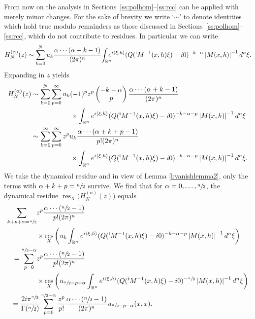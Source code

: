 \documentclass[10pt]{amsart}
\theoremstyle{definition}
\let\cv\alpha
\let\euler X
\DeclareMathOperator{\resnorm}{res}
\newcommand{\resdyn}{{\resnorm_\euler}}
\newcommand{\module}[1]{\left|#1\right|}
\newcommand{\secs}[2]{Sections~\ref{#1}--\ref{#2}}
\def\sn2{\sfrac{n}{2}}
\renewcommand{\t}{{{}^{\mathrm{t}\mkern-2mu}}}
\begin{document}
From now on the analysis in \secs{ss:polhom}{ss:rcc} can be applied with merely minor changes. For the sake of brevity we write `$\sim$' to denote identities which hold true modulo remainders as those discussed in \secs{ss:polhom}{ss:rcc}, which do not contribute to residues. In particular we can write
\[
H_N^{(\cv)}(z) \sim \sum_{k=0}^N u_k \frac{\cv\cdots(\cv+k-1)}{(2\pi)^n} \!\int_{\mathbb{R}^n}\hspace*{-2.5mm} e^{i\left\langle\xi,h \right\rangle}
(Q(\t M^{-1}(x,h)\xi)-i0)^{-k-\cv} \module{M(x,h)}^{-1} d^n\xi.
\]
Expanding in $z$ yields
\[
\begin{aligned}
H_N^{(\cv)}(z)&\sim \sum_{k=0}^N\sum_{p=0}^\infty u_k (-1)^pz^p \begin{pmatrix}
-k-\cv
\\
p
\end{pmatrix} \frac{\cv\cdots(\cv+k-1)}{(2\pi)^n}\\
&\hspace*{2cm} \times \int_{\mathbb{R}^n} e^{i\left\langle\xi,h \right\rangle}
(Q(\t M^{-1}(x,h)\xi)-i0)^{-k-\cv-p} \module{M(x,h)}^{-1} d^n\xi
\\ & \sim \sum_{k=0}^\infty \sum_{p=0}^\infty z^p u_k \frac{\cv\cdots(\cv+k+p-1)}{p!(2\pi)^n}\\
&\hspace*{2cm} \times\int_{\mathbb{R}^n} e^{i\left\langle\xi,h \right\rangle}
(Q(\t M^{-1}(x,h)\xi)-i0)^{-k-\cv-p} \module{M(x,h)}^{-1} d^n\xi.
\end{aligned}
\]
We take the dynamical residue and in view of Lemma \ref{l:vanishlemma2}, only the
terms with $\cv+k+p=\sfrac{n}{2}$ survive. We find that for $\cv=0,\dots,\sn2$, the dynamical residue $\resdyn\big(H_N^{(\cv)}(z)\big)$ equals
\[
\begin{aligned}
\sum_{k+p+\cv=\sfrac{n}{2}}
&z^p \frac{\cv\cdots(\sfrac{n}{2}-1)}{p!(2\pi)^n}\\
&\times\resdyn\left(u_k\int_{\mathbb{R}^n} e^{i\left\langle\xi,h \right\rangle}
(Q(\t M^{-1}(x,h)\xi)-i0)^{-k-\cv-p} \module{M(x,h)}^{-1} d^n\xi\right)
\\
=\sum_{p=0}^{\sfrac{n}{2}-\cv}
&z^p \frac{\cv\cdots(\sfrac{n}{2}-1)}{p!(2\pi)^n}\\
&\times\resdyn\left(u_{\sfrac{n}{2}-p-\cv}\int_{\mathbb{R}^n} e^{i\left\langle\xi,h \right\rangle}
(Q(\t M^{-1}(x,h)\xi)-i0)^{-\sfrac{n}{2}} \module{M(x,h)}^{-1} d^n\xi\right)\\
&\hspace*{-1.3cm}=\frac{2i\pi^{\sfrac{n}{2}}}{\Gamma(\sfrac{n}{2})}\sum_{p=0}^{\sfrac{n}{2}-\cv}
\frac{z^p}{p!} \frac{\cv\cdots(\sfrac{n}{2}-1)}{(2\pi)^n}u_{\sfrac{n}{2}-p-\cv}(x,x).
\end{aligned}
\]
\end{document}
